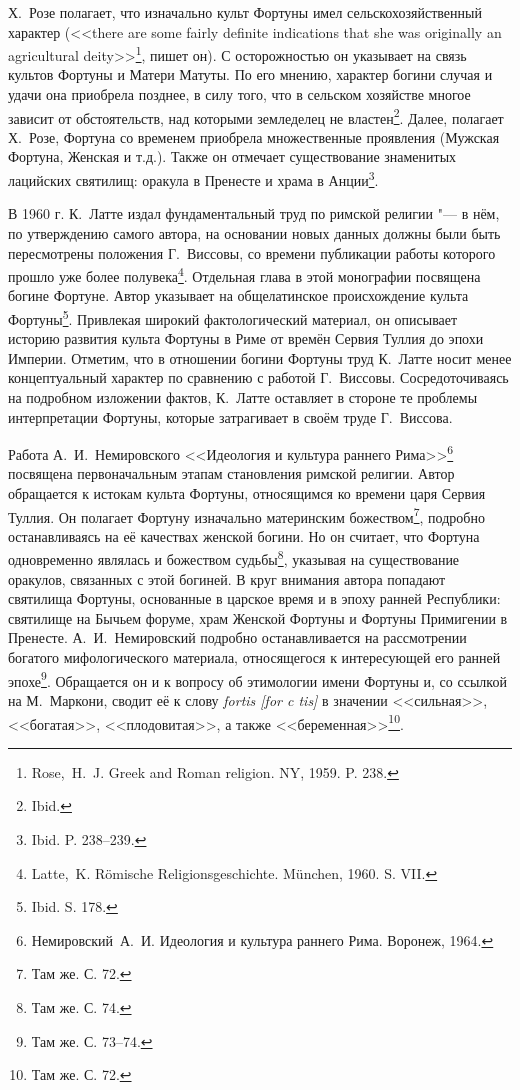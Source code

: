 Х.~Розе полагает, что изначально культ Фортуны имел сельскохозяйственный характер (<<there are some fairly definite indications that she was originally an agricultural deity>>\footnote{Rose,~H.~J. Greek and Roman religion. NY, 1959. P. 238.}, пишет он). С осторожностью он указывает на связь культов Фортуны и Матери Матуты. По его мнению, характер богини случая и удачи она приобрела позднее, в силу того, что в сельском хозяйстве многое зависит от обстоятельств, над которыми земледелец не властен\footnote{Ibid.}. Далее, полагает Х.~Розе, Фортуна со временем приобрела множественные проявления (Мужская Фортуна, Женская и т.д.). Также он отмечает существование знаменитых лацийских святилищ: оракула в Пренесте и храма в Анции\footnote{Ibid. P. 238--239.}.

В 1960 г. К.~Латте издал фундаментальный труд по римской религии "--- в нём, по утверждению самого автора, на основании новых данных должны были быть пересмотрены положения Г.~Виссовы, со времени публикации работы которого прошло уже более полувека\footnote{Latte,~K. R\"{o}mische Religionsgeschichte. M\"{u}nchen, 1960. S. VII.}. Отдельная глава в этой монографии посвящена богине Фортуне. Автор указывает на общелатинское происхождение культа Фортуны\footnote{Ibid. S. 178.}. Привлекая широкий фактологический материал, он описывает историю развития культа Фортуны в Риме от времён Сервия Туллия до эпохи Империи. Отметим, что в отношении богини Фортуны труд К.~Латте носит менее концептуальный характер по сравнению с работой Г.~Виссовы. Сосредоточиваясь на подробном изложении фактов, К.~Латте оставляет в стороне те проблемы интерпретации Фортуны, которые затрагивает в своём труде Г.~Виссова.

Работа А.~И.~Немировского <<Идеология и культура раннего Рима>>\footnote{Немировский~А.~И. Идеология и культура раннего Рима. Воронеж, 1964.} посвящена первоначальным этапам становления римской религии. Автор обращается к истокам культа Фортуны, относящимся ко времени царя Сервия Туллия. Он полагает Фортуну изначально материнским божеством\footnote{Там же. С. 72.}, подробно останавливаясь на её качествах женской богини. Но он считает, что Фортуна одновременно являлась и божеством судьбы\footnote{Там же. С. 74.}, указывая на существование оракулов, связанных с этой богиней. В круг внимания автора попадают святилища Фортуны, основанные в царское время и в эпоху ранней Республики: святилище на Бычьем форуме, храм Женской Фортуны и Фортуны Примигении в Пренесте. А.~И.~Немировский подробно останавливается на рассмотрении богатого мифологического материала, относящегося к интересующей его ранней эпохе\footnote{Там же. С. 73--74.}. Обращается он и к вопросу об этимологии имени Фортуны и, со ссылкой на М.~Маркони, сводит её к слову \textit{fortis [for c tis]} в значении <<сильная>>, <<богатая>>, <<плодовитая>>, а также <<беременная>>\footnote{Там же. С. 72.}.


